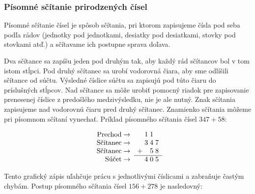 \documentclass{article}
\begin{document}
\subsubsection{Písomné sčítanie prirodzených čísel} 

Písomné sčítanie čísel je spôsob sčítania, pri ktorom zapisujeme čísla pod seba podľa rádov (jednotky pod jednotkami, desiatky pod desiatkami, stovky pod stovkami atď.) a sčítavame ich postupne sprava doľava.

Dva sčítance sa zapíšu jeden pod druhým tak, aby každý rád sčítancov bol v tom istom stĺpci. Pod druhý sčítanec sa urobí vodorovná čiara, aby sme odlíšili sčítance od súčtu. Výsledné číslice súčtu sa zapisujú pod túto čiaru do príslušných stĺpcov. Nad sčítance sa môže urobiť pomocný riadok pre zapisovanie prenesenej číslice z predošlého medzivýsledku, nie je ale nutný. Znak sčítania zapisujeme nad vodorovnú čiaru pred druhý sčítanec. Znamienko sčítania môžeme pri písomnom sčítaní vynechať. Príklad písomného sčítania čísel \(347 + 58\):
\begin{table}[H]
  \centering
  \[
  \begin{array}{r}
    \text{Prechod} \rightarrow \\
    \text{Sčítanec} \rightarrow \\
    \text{Sčítanec} \rightarrow \\
    \text{Súčet} \rightarrow \\
  \end{array}
  \begin{array}{c@{\;}c@{\;}c@{\;}c}
      & 1 & 1 &  \\
      & 3 & 4 & 7 \\
    + &   & 5 & 8 \\
    \hline
      & 4 & 0 & 5
  \end{array}
  \]
\end{table}

Tento grafický zápis uľahčuje prácu s jednotlivými číslicami a zabraňuje častým chybám. Postup písomného sčítania čísel \(156 + 278\) je nasledovný:
\end{document}
